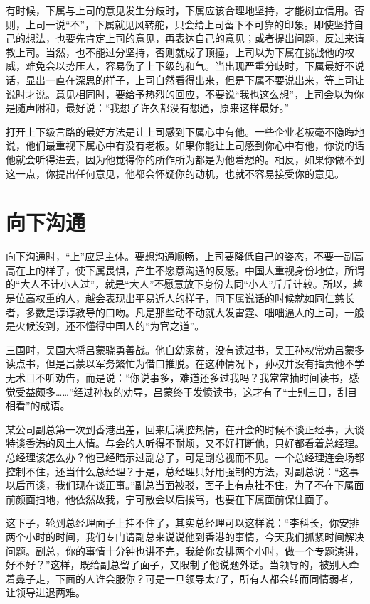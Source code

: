 \documentclass[fontset=fandol, a4paper, 12pt, openright]{ctexbook}
\begin{document}
有时候，下属与上司的意见发生分歧时，下属应该合理地坚持，才能树立信用。否则，上司一说“不”，下属就见风转舵，只会给上司留下不可靠的印象。即使坚持自己的想法，也要先肯定上司的意见，再表达自己的意见；或者提出问题，反过来请教上司。当然，也不能过分坚持，否则就成了顶撞，上司以为下属在挑战他的权威，难免会以势压人，容易伤了上下级的和气。当出现严重分歧时，下属最好不说话，显出一直在深思的样子，上司自然看得出来，但是下属不要说出来，等上司让说时才说。意见相同时，要给予热烈的回应，不要说“我也这么想”，上司会以为你是随声附和，最好说：“我想了许久都没有想通，原来这样最好。”

打开上下级言路的最好方法是让上司感到下属心中有他。一些企业老板毫不隐晦地说，他们最重视下属心中有没有老板。如果你能让上司感到你心中有他，你说的话他就会听得进去，因为他觉得你的所作所为都是为他着想的。相反，如果你做不到这一点，你提出任何意见，他都会怀疑你的动机，也就不容易接受你的意见。


\section{向下沟通}

向下沟通时，“上”应是主体。要想沟通顺畅，上司要降低自己的姿态，不要一副高高在上的样子，使下属畏惧，产生不愿意沟通的反感。中国人重视身份地位，所谓的“大人不计小人过”，就是“大人”不愿意放下身份去同“小人”斤斤计较。所以，越是位高权重的人，越会表现出平易近人的样子，同下属说话的时候就如同仁慈长者，多数是谆谆教导的口吻。凡是那些动不动就大发雷霆、咄咄逼人的上司，一般是火候没到，还不懂得中国人的“为官之道”。

三国时，吴国大将吕蒙骁勇善战。他自幼家贫，没有读过书，吴王孙权常劝吕蒙多读点书，但是吕蒙以军务繁忙为借口推脱。在这种情况下，孙权并没有指责他不学无术且不听劝告，而是说：“你说事多，难道还多过我吗？我常常抽时间读书，感觉受益颇多……”经过孙权的劝导，吕蒙终于发愤读书，这才有了“士别三日，刮目相看”的成语。

某公司副总第一次到香港出差，回来后满腔热情，在开会的时候不谈正经事，大谈特谈香港的风土人情。与会的人听得不耐烦，又不好打断他，只好都看着总经理。总经理该怎么办？他已经暗示过副总了，可是副总视而不见。一个总经理连会场都控制不住，还当什么总经理？于是，总经理只好用强制的方法，对副总说：“这事以后再谈，我们现在谈正事。”副总当面被驳，面子上有点挂不住，为了不在下属面前颜面扫地，他依然故我，宁可散会以后挨骂，也要在下属面前保住面子。

这下子，轮到总经理面子上挂不住了，其实总经理可以这样说：“李科长，你安排两个小时的时间，我们专门请副总来说说他到香港的事情，今天我们抓紧时间解决问题。副总，你的事情十分钟也讲不完，我给你安排两个小时，做一个专题演讲，好不好？”这样，既给副总留了面子，又限制了他说题外话。当领导的，被别人牵着鼻子走，下面的人谁会服你？可是一旦领导太?了，所有人都会转而同情弱者，让领导进退两难。
\end{document}
